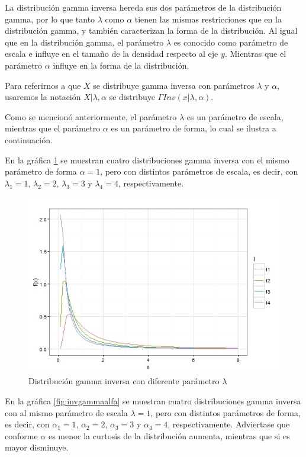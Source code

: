 La distribución gamma inversa hereda sus dos parámetros de la distribución gamma, por lo que tanto $\lambda$ como $\alpha$ tienen las mismas restricciones que en la distribución gamma, y también caracterizan la forma de la distribución. Al igual que en la distribución gamma, el parámetro $\lambda$ es conocido como parámetro de escala e influye en el tamaño de la densidad respecto al eje $y$. Mientras que el parámetro $\alpha$ influye en la forma de la distribución. 

Para referirnos a que $X$ se distribuye gamma inversa con parámetros $\lambda$ y $\alpha$, usaremos la notación $X|\lambda,\alpha$ se distribuye $\Gamma Inv(x|\lambda,\alpha)$.

Como se mencionó anteriormente, el parámetro $\lambda$ es un parámetro de escala, mientras que el parámetro $\alpha$ es un parámetro de forma, lo cual se ilustra a continuación.

En la gráfica \ref{fig:invgammalambda} se muestran cuatro distribuciones gamma inversa con el mismo parámetro de forma $\alpha=1$, pero con distintos parámetros de escala, es decir, con $\lambda_{1}=1$, $\lambda_{2}=2$, $\lambda_{3}=3$ y $\lambda_{4}=4$, respectivamente. 

\begin{figure}[ht]
	\centering
	\includegraphics[width=1\linewidth]{Figuras/invgammalambda}
	\caption{Distribución gamma inversa con diferente parámetro $\lambda$}
	\label{fig:invgammalambda}
\end{figure}

En la gráfica \ref{fig:invgammaalfa} se muestran cuatro distribuciones gamma inversa con al mismo parámetro de escala $\lambda=1$, pero con distintos parámetros de forma, es decir, con $\alpha_{1}=1$, $\alpha_{2}=2$, $\alpha_{3}=3$ y $\alpha_{4}=4$, respectivamente. Adviertase que conforme $\alpha$ es menor la curtosis de la distribución aumenta, mientras que si es mayor disminuye.

